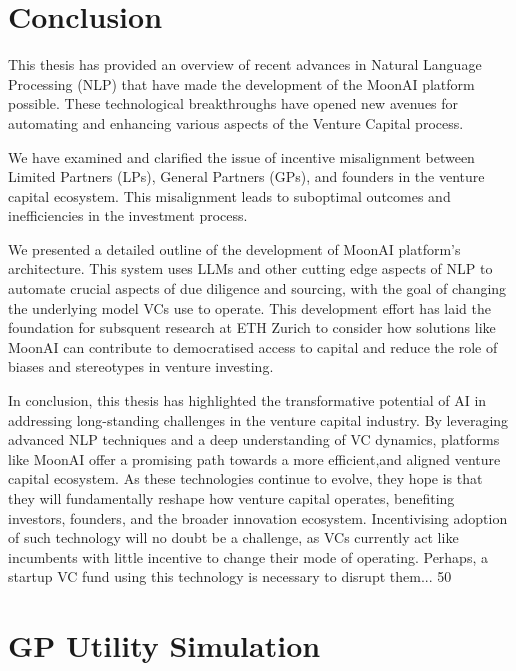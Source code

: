 \documentclass[a4paper, oneside]{discothesis}
\begin{document}
\chapter{Conclusion}

This thesis has provided an overview of recent advances in Natural Language Processing (NLP) that have made the development of the MoonAI platform possible. These technological breakthroughs have opened new avenues for automating and enhancing various aspects of the Venture Capital process.

We have examined and clarified the issue of incentive misalignment between Limited Partners (LPs), General Partners (GPs), and founders in the venture capital ecosystem. This misalignment leads to suboptimal outcomes and inefficiencies in the investment process. 

We presented a detailed outline of the development of MoonAI platform's architecture. This system uses LLMs and other cutting edge aspects of NLP to automate crucial aspects of due diligence and sourcing, with the goal of changing the underlying model VCs use to operate. This development effort has laid the foundation for subsquent research at ETH Zurich to consider how solutions like MoonAI can contribute to democratised access to capital and reduce the role of biases and stereotypes in venture investing. 

In conclusion, this thesis has highlighted the transformative potential of AI in
addressing long-standing challenges in the venture capital industry. By leveraging
advanced NLP techniques and a deep understanding of VC dynamics, platforms
like MoonAI offer a promising path towards a more efficient,and aligned venture
capital ecosystem. As these technologies continue to evolve, they hope is that they
will fundamentally reshape how venture capital operates, benefiting investors,
founders, and the broader innovation ecosystem. Incentivising adoption of such
technology will no doubt be a challenge, as VCs currently act like incumbents
with little incentive to change their mode of operating. Perhaps, a startup VC
fund using this technology is necessary to disrupt them...
50





\appendix
\chapter{GP Utility Simulation}
\end{document}
